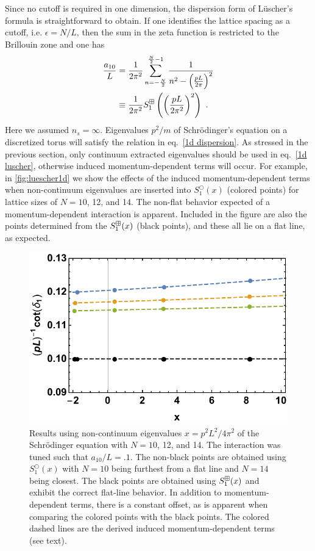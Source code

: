Since no cutoff is required in one dimension, the dispersion form of L\"uscher's formula is straightforward to obtain.  If one identifies the lattice spacing as a cutoff, i.e. $\epsilon = N/L$, then the sum in the zeta function is restricted to the Brillouin zone and one has
\begin{align}
 \frac{a_{10}}{L} &=\frac{1}{2 \pi^{2}} \sum_{n=-\frac{N}{2}}^{\frac{N}{2}-1} \frac{1}{n^{2}-\left(\frac{p L}{2 \pi}\right)^{2}} \\
 & \equiv \frac{1}{2 \pi^{2}} S^{\boxplus}_{1}\left(\left(\frac{p L}{2 \pi^{2}}\right)^{2}\right)\ .\label{eq:1d dispersion}
 \end{align}
 Here we assumed $n_s=\infty$.  
Eigenvalues $p^2/m$ of Schr\"odinger's equation on a discretized torus will satisfy the relation in eq.~\eqref{1d dispersion}.  As stressed in the previous section, only continuum extracted eigenvalues should be used in eq.~\eqref{1d luscher}, otherwise induced momentum-dependent terms will occur.  For example, in \autoref{fig:luescher1d} we show  the effects of the induced momentum-dependent terms when non-continuum eigenvalues are inserted into $S^\bigcirc_1(x)$ (colored points) for lattice sizes of $N=10$, 12, and 14.  The non-flat behavior expected of a momentum-dependent interaction is apparent.  Included in the figure are also the points determined from the $S^{\boxplus}_1(x)$ (black points), and these all lie on a flat line, as expected.  
\begin{figure}
\center
\includegraphics[width=.65\textwidth]{figure/luescher1d.pdf}
\caption{Results using non-continuum eigenvalues $x=p^2L^2/4\pi^2$ of the Schr\"odinger equation with $N=10$, 12, and 14.  The interaction was tuned such that $a_{10}/L=.1$.  The non-black points are obtained using $S^\bigcirc_1(x)$ with $N=10$ being furthest from a flat line and $N=14$ being closest.  The black points are obtained using $S^{\boxplus}_1(x)$  and exhibit the correct flat-line behavior.  In addition to momentum-dependent terms, there is a constant offset, as is apparent when comparing the colored points with the black points.  The colored dashed lines are the derived induced momentum-dependent terms (see text).\label{fig:luescher1d}}
\end{figure}


